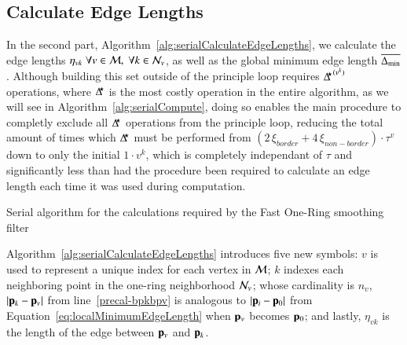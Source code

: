 \subsection{Calculate Edge Lengths}
In the second part, Algorithm~\ref{alg:serialCalculateEdgeLengths}, we calculate the edge lengths $\eta_{vk} \; \forall v \in \mathcal{M}, \; \forall  k \in \mathcal{N}_v$, as well as the global minimum edge length $\overline{\Delta_\text{min}}$. Although building this set outside of the principle loop requires ${\Delta^{\kern-3pt\star}}^{(v^k)}$ operations, where $\Delta^{\kern-3pt\star}$ is the most costly operation in the entire algorithm, as we will see in Algorithm~\ref{alg:serialCompute}, doing so enables the main procedure to completly exclude all $\Delta^{\kern-3pt\star}$ operations from the principle loop, reducing the total amount of times which $\Delta^{\kern-3pt\star}$ must be performed from ${(2\,\xi_{border} + 4\,\xi_{non-border})\cdot\tau^v}$ down to only the initial $1\cdot v^k$, which is completely independant of $\tau$ and significantly less than had the procedure been required to calculate an edge length each time it was used during computation.
%
%
\begin{algorithm}
	\DontPrintSemicolon


	\bigskip
	\;
\nl	{}
	\caption{Serial algorithm for the calculations required by the Fast One-Ring smoothing filter\label{alg:serialCalculateEdgeLengths}}
\end{algorithm}%
%
%
%

Algorithm~\ref{alg:serialCalculateEdgeLengths} introduces five new symbols: $v$ is used to represent a unique index for each vertex in $\mathcal{M}$; $k$ indexes each neighboring point in the one-ring neighborhood $\mathcal{N}_v$; whose cardinality is $n_v$, $|\mathbf{p}_k-\mathbf{p}_v|$ from line~\ref{precal-bpkbpv} is analogous to $|\mathbf{p}_i-\mathbf{p}_0|$ from Equation~\ref{eq:localMinimumEdgeLength} when $\mathbf{p}_v$ becomes $\mathbf{p}_0$; and lastly, $\eta_{vk}$ is the length of the edge between $\mathbf{p}_v$ and $\mathbf{p}_k$.%
%
